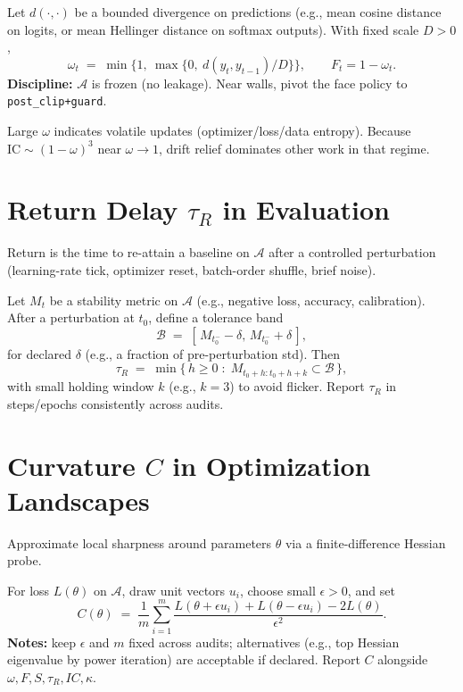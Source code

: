 \begin{eqbox}
Let $d(\cdot,\cdot)$ be a bounded divergence on predictions (e.g., mean cosine distance on logits, or mean Hellinger distance on softmax outputs). With fixed scale $D>0$,
\[
\omega_t \;=\; \min\!\{1,\ \max\!\{0,\ d(y_t,y_{t-1})/D\}\bigr\},\qquad
F_t = 1-\omega_t .
\]
\textbf{Discipline:} $\mathcal{A}$ is frozen (no leakage). Near walls, pivot the face policy to \texttt{post\_clip+guard}.
\end{eqbox}


Large \(\omega\) indicates volatile updates (optimizer/loss/data entropy). Because \(\mathrm{IC}\sim(1-\omega)^3\) near \(\omega\to 1\), drift relief dominates other work in that regime.

\section{Return Delay \texorpdfstring{\(\tau_{R}\)}{tauR} in Evaluation}
\label{sec:ai-return}
Return is the time to re-attain a baseline on \(\mathcal{A}\) after a controlled perturbation (learning-rate tick, optimizer reset, batch-order shuffle, brief noise).

\begin{eqbox}
Let $M_t$ be a stability metric on $\mathcal{A}$ (e.g., negative loss, accuracy, calibration). After a perturbation at $t_0$, define a tolerance band
\[
\mathcal{B} \;=\; [\,M_{t_0^-}-\delta,\, M_{t_0^-}+\delta\,],
\]
for declared $\delta$ (e.g., a fraction of pre-perturbation std). Then
\[
\tau_R \;=\; \min\{\,h\ge 0 \;:\; M_{t_0+h:t_0+h+k}\subset \mathcal{B}\,\},
\]
with small holding window $k$ (e.g., $k{=}3$) to avoid flicker. Report $\tau_R$ in steps/epochs consistently across audits.
\end{eqbox}


\section{Curvature \texorpdfstring{\(C\)}{C} in Optimization Landscapes}
\label{sec:ai-curvature}
Approximate local sharpness around parameters \(\theta\) via a finite-difference Hessian probe.

\begin{eqbox}
For loss $L(\theta)$ on $\mathcal{A}$, draw unit vectors $u_i$, choose small $\epsilon>0$, and set
\[
C(\theta) \;=\; \frac{1}{m}\sum_{i=1}^m
\frac{L(\theta+\epsilon u_i)+L(\theta-\epsilon u_i)-2L(\theta)}{\epsilon^2}.
\]
\textbf{Notes:} keep $\epsilon$ and $m$ fixed across audits; alternatives (e.g., top Hessian eigenvalue by power iteration) are acceptable if declared. Report $C$ alongside $\omega,F,S,\tau_R,IC,\kappa$.
\end{eqbox}


